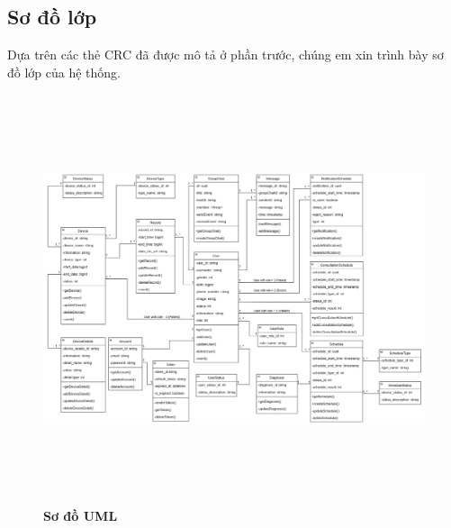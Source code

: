 \subsection{Sơ đồ lớp}
Dựa trên các thẻ CRC đã được mô tả ở phần trước, chúng em xin trình bày sơ đồ lớp của hệ thống.

\begin{figure}[H]
	\centering
	\includegraphics[width=16cm,height=12cm]{Images/system/fmECG_UML.png}
	\caption[Sơ đồ ERD]{\bfseries \fontsize{12pt}{0pt}\selectfont Sơ đồ UML}
	\label{fmECG_UML}
\end{figure}

